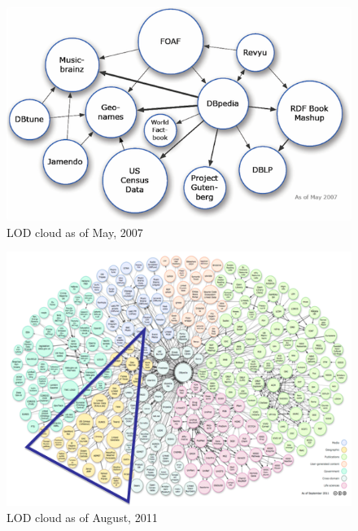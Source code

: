 \begin{figure}[ht!]
\includegraphics[scale=0.9]{img/lod-cloud2007.png}
\caption{LOD cloud as of May, 2007}
\label{fig:lodcloud2007}
\end{figure}

\begin{figure}[ht!]
\includegraphics[scale=0.9]{img/lod-diagram-2011.png}
\caption{LOD cloud as of August, 2011}
\label{fig:lodcloud2011}
\end{figure}

\begin{figure}[ht!]
\end{figure}



